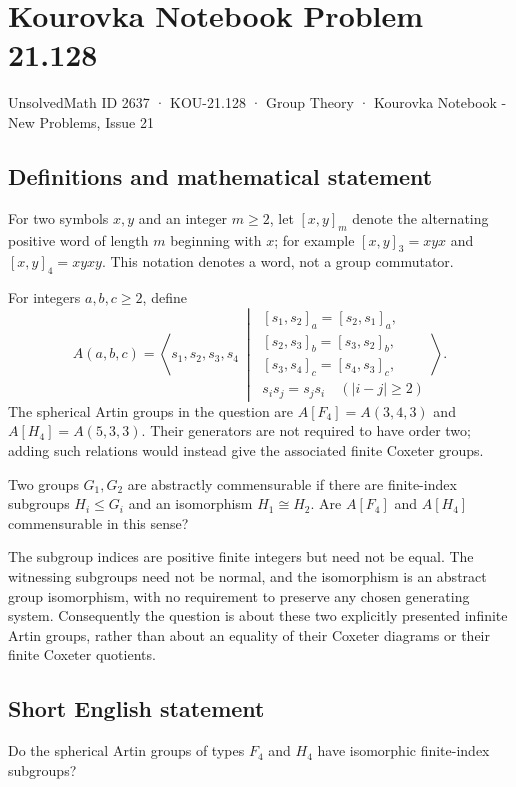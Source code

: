 \documentclass[11pt,a4paper]{article}
\begin{document}
\section*{Kourovka Notebook Problem 21.128}\label{2637}
{\small UnsolvedMath ID 2637 · KOU-21.128 · Group Theory · Kourovka Notebook - New Problems, Issue 21}
\subsection{Definitions and mathematical statement}
For two symbols $x,y$ and an integer $m\ge2$, let $[x,y]_m$ denote the alternating positive word of length $m$ beginning with $x$; for example $[x,y]_3=xyx$ and $[x,y]_4=xyxy$. This notation denotes a word, not a group commutator.

For integers $a,b,c\ge2$, define
\[
 A(a,b,c)=\left\langle s_1,s_2,s_3,s_4\ \middle|\
 \begin{array}{l}
 [s_1,s_2]_a=[s_2,s_1]_a,\\
 {}[s_2,s_3]_b=[s_3,s_2]_b,\\
 {}[s_3,s_4]_c=[s_4,s_3]_c,\\
 s_is_j=s_js_i\quad(|i-j|\ge2)
 \end{array}\right\rangle.
\]
The spherical Artin groups in the question are $A[F_4]=A(3,4,3)$ and $A[H_4]=A(5,3,3)$. Their generators are not required to have order two; adding such relations would instead give the associated finite Coxeter groups.

Two groups $G_1,G_2$ are abstractly commensurable if there are finite-index subgroups $H_i\le G_i$ and an isomorphism $H_1\cong H_2$. Are $A[F_4]$ and $A[H_4]$ commensurable in this sense?

The subgroup indices are positive finite integers but need not be equal. The witnessing subgroups need not be normal, and the isomorphism is an abstract group isomorphism, with no requirement to preserve any chosen generating system. Consequently the question is about these two explicitly presented infinite Artin groups, rather than about an equality of their Coxeter diagrams or their finite Coxeter quotients.
\subsection{Short English statement}
Do the spherical Artin groups of types $F_4$ and $H_4$ have isomorphic finite-index subgroups?
\end{document}
